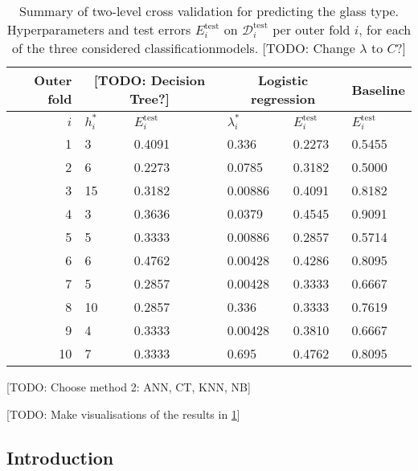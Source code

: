 \documentclass[dtu]{dtuarticle}
\newcommand{\todo}[1]{\color{red}[TODO: #1]\color{black}}
\begin{document}
	\begin{table}
		\centering
		\renewcommand{\arraystretch}{1.2}
		\begin{tabular}{| r || l | l || l | l || l |}
			\hline
			\textbf{Outer fold} & \multicolumn{2}{c||}{\textbf{\todo{Decision Tree?}}} & \multicolumn{2}{c||}{\textbf{Logistic regression}} & \textbf{Baseline}     \\ \hline\hline
			\(i\)               & \(h_i^*\) & \(E_i^{\text{test}}\)                    & \(\lambda_i^*\)  & \(E_i^{\text{test}}\)           & \(E_i^{\text{test}}\) \\ \hline
1 & 3 & \SI{ 0.4091 }{} & \SI{ 0.336 }{} & \SI{ 0.2273 }{} & \SI{ 0.5455 }{} \\
2 & 6 & \SI{ 0.2273 }{} & \SI{ 0.0785 }{} & \SI{ 0.3182 }{} & \SI{ 0.5000 }{} \\
3 & 15 & \SI{ 0.3182 }{} & \SI{ 0.00886 }{} & \SI{ 0.4091 }{} & \SI{ 0.8182 }{} \\
4 & 3 & \SI{ 0.3636 }{} & \SI{ 0.0379 }{} & \SI{ 0.4545 }{} & \SI{ 0.9091 }{} \\
5 & 5 & \SI{ 0.3333 }{} & \SI{ 0.00886 }{} & \SI{ 0.2857 }{} & \SI{ 0.5714 }{} \\
6 & 6 & \SI{ 0.4762 }{} & \SI{ 0.00428 }{} & \SI{ 0.4286 }{} & \SI{ 0.8095 }{} \\
7 & 5 & \SI{ 0.2857 }{} & \SI{ 0.00428 }{} & \SI{ 0.3333 }{} & \SI{ 0.6667 }{} \\
8 & 10 & \SI{ 0.2857 }{} & \SI{ 0.336 }{} & \SI{ 0.3333 }{} & \SI{ 0.7619 }{} \\
9 & 4 & \SI{ 0.3333 }{} & \SI{ 0.00428 }{} & \SI{ 0.3810 }{} & \SI{ 0.6667 }{} \\
10 & 7 & \SI{ 0.3333 }{} & \SI{ 0.695 }{} & \SI{ 0.4762 }{} & \SI{ 0.8095 }{} \\
\hline
		\end{tabular}
		\caption{Summary of two-level cross validation for predicting the glass type. Hyperparameters and test errors $E_i^\text{test}$ on $\mathcal{D}_i^\text{test}$ per outer fold $i$, for each of the three considered classificationmodels. \todo{Change $\lambda$ to $C$?}}
		\label{table:e-test-classification}
	\end{table}

	\todo{Choose method 2: ANN, CT, KNN, NB}

	\todo{Make visualisations of the results in \ref{table:e-test-classification}}

	\subsection{Introduction}
\end{document}
